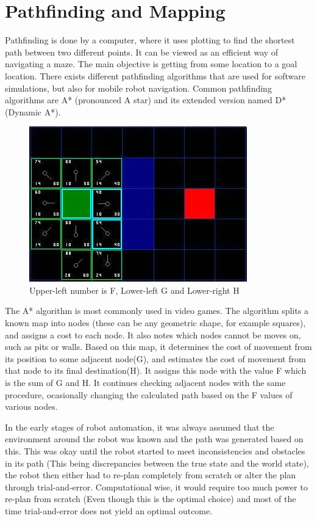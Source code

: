\clearpage
\section{Pathfinding and Mapping}

Pathfinding is done by a computer, where it uses plotting to find the shortest path between two different points. It can be viewed as an efficient way of navigating a maze. The main objective is getting from some location to a goal location.
There exists different pathfinding algorithms that are used for software simulations, but also for mobile robot navigation. Common pathfinding algorithms are A* (pronounced A star) and its extended version named D* (Dynamic A*).

\begin{figure}[H]
\centering
\includegraphics[width=.7\linewidth]{images/aStar2.jpg}
\caption{Upper-left number is F, Lower-left G and Lower-right H}
\label{fig:sub2}
\end{figure}

The A* algorithm is most commonly used in video games. The algorithm splits a known map into nodes (these can be any geometric shape, for example squares), and assigns a cost to each node. It also notes which nodes cannot be moves on, such as pits or walls. Based on this map, it determines the cost of movement from its position to some adjacent node(G), and estimates the cost of movement from that node to its final destination(H). It assigns this node with the value F which is the sum of G and H. It continues checking adjacent nodes with the same procedure, ocasionally changing the calculated path based on the F values of various nodes.\cite{astar}

In the early stages of robot automation, it was always assumed that the environment around the robot was known and the path was generated based on this. This was okay until the robot started to meet inconsistencies and obstacles in its path (This being discrepancies between the true state and the world state), the robot then either had to re-plan completely from scratch or alter the plan through trial-and-error. Computational wise, it would require too much power to re-plan from scratch (Even though this is the optimal choice) and most of the time trial-and-error does not yield an optimal outcome.


